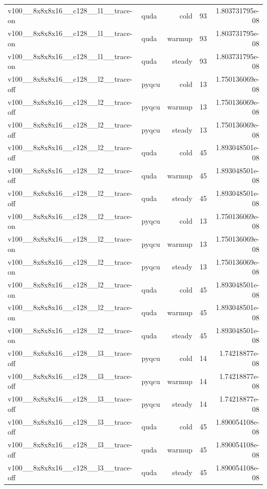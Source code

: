 \begin{table}[htbp]
\begin{tabular}{@{}llrrr@{}}
v100\_\_8x8x8x16\_\_c128\_\_l1\_\_trace-on & quda & cold & 93 & 1.803731795e-08 \\
v100\_\_8x8x8x16\_\_c128\_\_l1\_\_trace-on & quda & warmup & 93 & 1.803731795e-08 \\
v100\_\_8x8x8x16\_\_c128\_\_l1\_\_trace-on & quda & steady & 93 & 1.803731795e-08 \\
v100\_\_8x8x8x16\_\_c128\_\_l2\_\_trace-off & pyqcu & cold & 13 & 1.750136069e-08 \\
v100\_\_8x8x8x16\_\_c128\_\_l2\_\_trace-off & pyqcu & warmup & 13 & 1.750136069e-08 \\
v100\_\_8x8x8x16\_\_c128\_\_l2\_\_trace-off & pyqcu & steady & 13 & 1.750136069e-08 \\
v100\_\_8x8x8x16\_\_c128\_\_l2\_\_trace-off & quda & cold & 45 & 1.893048501e-08 \\
v100\_\_8x8x8x16\_\_c128\_\_l2\_\_trace-off & quda & warmup & 45 & 1.893048501e-08 \\
v100\_\_8x8x8x16\_\_c128\_\_l2\_\_trace-off & quda & steady & 45 & 1.893048501e-08 \\
v100\_\_8x8x8x16\_\_c128\_\_l2\_\_trace-on & pyqcu & cold & 13 & 1.750136069e-08 \\
v100\_\_8x8x8x16\_\_c128\_\_l2\_\_trace-on & pyqcu & warmup & 13 & 1.750136069e-08 \\
v100\_\_8x8x8x16\_\_c128\_\_l2\_\_trace-on & pyqcu & steady & 13 & 1.750136069e-08 \\
v100\_\_8x8x8x16\_\_c128\_\_l2\_\_trace-on & quda & cold & 45 & 1.893048501e-08 \\
v100\_\_8x8x8x16\_\_c128\_\_l2\_\_trace-on & quda & warmup & 45 & 1.893048501e-08 \\
v100\_\_8x8x8x16\_\_c128\_\_l2\_\_trace-on & quda & steady & 45 & 1.893048501e-08 \\
v100\_\_8x8x8x16\_\_c128\_\_l3\_\_trace-off & pyqcu & cold & 14 & 1.74218877e-08 \\
v100\_\_8x8x8x16\_\_c128\_\_l3\_\_trace-off & pyqcu & warmup & 14 & 1.74218877e-08 \\
v100\_\_8x8x8x16\_\_c128\_\_l3\_\_trace-off & pyqcu & steady & 14 & 1.74218877e-08 \\
v100\_\_8x8x8x16\_\_c128\_\_l3\_\_trace-off & quda & cold & 45 & 1.890054108e-08 \\
v100\_\_8x8x8x16\_\_c128\_\_l3\_\_trace-off & quda & warmup & 45 & 1.890054108e-08 \\
v100\_\_8x8x8x16\_\_c128\_\_l3\_\_trace-off & quda & steady & 45 & 1.890054108e-08 \\

\end{tabular}
\end{table}
